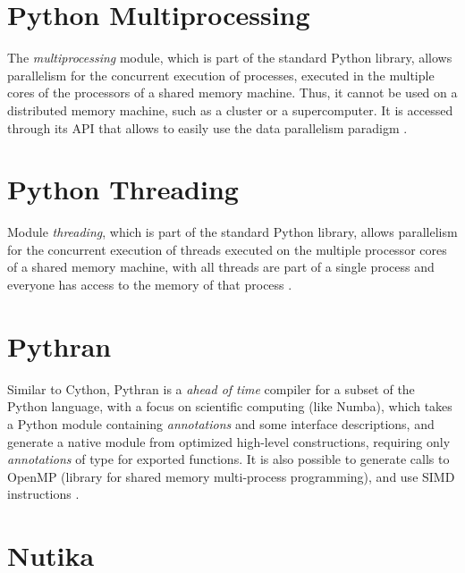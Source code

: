 \section{Python Multiprocessing}

The \textit{multiprocessing} module, which is part of the standard Python library, allows parallelism for the concurrent execution of processes, executed in the multiple cores of the processors of a shared memory machine. Thus, it cannot be used on a distributed memory machine, such as a cluster or a supercomputer. It is accessed through its API that allows to easily use the data parallelism paradigm \cite{Singh2013}.




\section{Python Threading}

Module \textit{threading}, which is part of the standard Python library, allows parallelism for the concurrent execution of threads executed on the multiple processor cores of a shared memory machine, with all threads are part of a single process and everyone has access to the memory of that process \cite{Marowka2018b}.



\section{Pythran}

Similar to Cython, Pythran is a \textit{ahead of time} compiler for a subset of the Python language, with a focus on scientific computing (like Numba), which takes a Python module containing \textit{annotations} and some interface descriptions, and generate a native module from optimized high-level constructions, requiring only \textit{annotations} of type for exported functions. It is also possible to generate calls to OpenMP (library for shared memory multi-process programming), and use SIMD instructions \cite {Guelton2015, Guelton2018}.




\section{Nutika}

